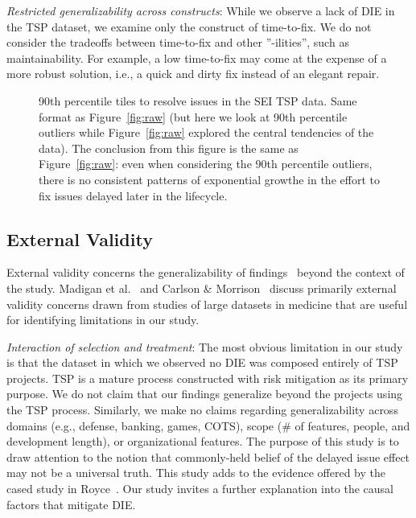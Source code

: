 \documentclass[smallcondensed]{svjour3}
\newcommand{\fig}[1]{Figure~\ref{fig:#1}}
\def\baselinestretch{1}
\begin{document}
\textit{Restricted generalizability across constructs}: While we observe a lack of DIE in the TSP dataset, we examine only the construct of time-to-fix. We do not consider the tradeoffs between time-to-fix and other ''-ilities'', such as maintainability. For example, a low time-to-fix may come at the expense of a more robust solution, i.e., a quick and dirty fix instead of an elegant repair.

\begin{figure}[!t]
\begin{center}

\end{center}
\caption{90th percentile tiles to resolve issues in the SEI TSP data. Same format as \fig{raw} (but here we look at 90th percentile
outliers while   \fig{raw} explored the central tendencies of the data). The conclusion from this figure is the same
as \fig{raw}: even when considering the 90th percentile outliers, there is no consistent patterns of 
exponential growthe in the effort to fix issues delayed later in the lifecycle.}\label{fig:last}
\end{figure}

\subsection{External Validity}
\label{sect:external_validity}
External validity concerns the generalizability of findings~\cite{wohlin2012} beyond the context of the study. Madigan et al.~\cite{madigan2014} and Carlson \& Morrison~\cite{carlson2009} discuss primarily external validity concerns drawn from studies of large datasets in medicine that are useful for identifying limitations in our study.

\textit{Interaction of selection and treatment}: The most obvious limitation in our study is that the dataset in which we observed no DIE was composed entirely of TSP projects. TSP is a mature process constructed with risk mitigation as its primary purpose. We do not claim that our findings generalize beyond the projects using the TSP process. Similarly, we make no claims regarding generalizability across domains (e.g., defense, banking, games, COTS), scope (\# of features, people, and development length), or organizational features. The purpose of this study is to draw attention to the notion that commonly-held belief of the delayed issue effect may not be a universal truth. This study adds to the evidence offered by the cased study in Royce~\cite{Royce98}. Our study invites a further explanation into the causal factors that mitigate DIE.
\end{document}
